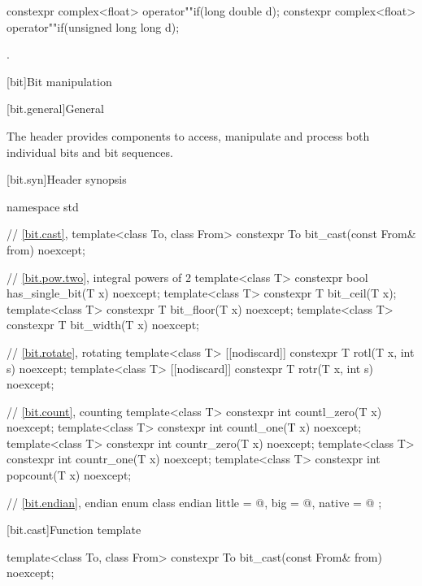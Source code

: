 %
\begin{itemdecl}
constexpr complex<float> operator""if(long double d);
constexpr complex<float> operator""if(unsigned long long d);
\end{itemdecl}

\begin{itemdescr}
\pnum
\returns
{}.
\end{itemdescr}


[bit]{Bit manipulation}

[bit.general]{General}

\pnum
The header  provides components to access,
manipulate and process both individual bits and bit sequences.

[bit.syn]{Header  synopsis}

\begin{codeblock}
namespace std {
  // \ref{bit.cast}, 
  template<class To, class From>
    constexpr To bit_cast(const From& from) noexcept;

  // \ref{bit.pow.two}, integral powers of 2
  template<class T>
    constexpr bool has_single_bit(T x) noexcept;
  template<class T>
    constexpr T bit_ceil(T x);
  template<class T>
    constexpr T bit_floor(T x) noexcept;
  template<class T>
    constexpr T bit_width(T x) noexcept;

  // \ref{bit.rotate}, rotating
  template<class T>
    [[nodiscard]] constexpr T rotl(T x, int s) noexcept;
  template<class T>
    [[nodiscard]] constexpr T rotr(T x, int s) noexcept;

  // \ref{bit.count}, counting
  template<class T>
    constexpr int countl_zero(T x) noexcept;
  template<class T>
    constexpr int countl_one(T x) noexcept;
  template<class T>
    constexpr int countr_zero(T x) noexcept;
  template<class T>
    constexpr int countr_one(T x) noexcept;
  template<class T>
    constexpr int popcount(T x) noexcept;

  // \ref{bit.endian}, endian
  enum class endian {
    little = @\seebelow@,
    big    = @\seebelow@,
    native = @\seebelow@
  };
}
\end{codeblock}

[bit.cast]{Function template }

%
\begin{itemdecl}
template<class To, class From>
  constexpr To bit_cast(const From& from) noexcept;
\end{itemdecl}

